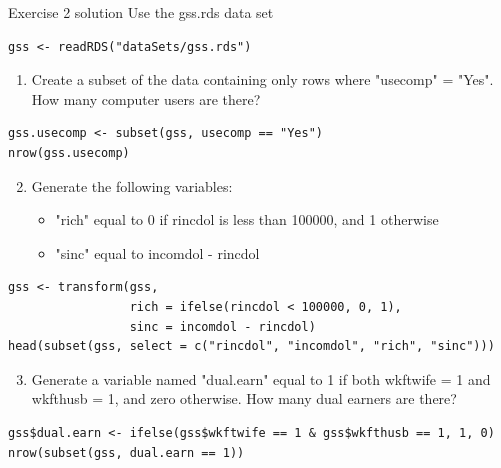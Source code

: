 \documentclass[table,smaller]{beamer}
\begin{document}
\begin{frame}[fragile,label=sec-9-3]{Exercise 2 solution}
 Use the gss.rds data set
\begin{verbatim}
gss <- readRDS("dataSets/gss.rds")
\end{verbatim}

\begin{enumerate}
\setcounter{enumi}{0}
\item Create a subset of the data containing only rows where "usecomp" = "Yes". How many computer users are there?
\end{enumerate}
\begin{verbatim}
gss.usecomp <- subset(gss, usecomp == "Yes")
nrow(gss.usecomp)
\end{verbatim}

\begin{enumerate}
\setcounter{enumi}{1}
\item Generate the following variables:
\begin{itemize}
\item "rich" equal to 0 if rincdol is less than 100000, and 1 otherwise
\item "sinc" equal to incomdol - rincdol
\end{itemize}
\end{enumerate}
\begin{verbatim}
gss <- transform(gss,
                 rich = ifelse(rincdol < 100000, 0, 1),
                 sinc = incomdol - rincdol)
head(subset(gss, select = c("rincdol", "incomdol", "rich", "sinc")))
\end{verbatim}


\begin{enumerate}
\setcounter{enumi}{2}
\item Generate a variable named "dual.earn" equal to 1 if both wkftwife = 1 and wkfthusb = 1, and zero otherwise. How many dual earners are there?
\end{enumerate}
\begin{verbatim}
gss$dual.earn <- ifelse(gss$wkftwife == 1 & gss$wkfthusb == 1, 1, 0)
nrow(subset(gss, dual.earn == 1))
\end{verbatim}
\end{frame}
\end{document}
